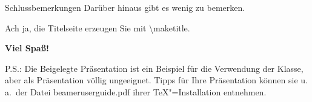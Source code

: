 \begin{frame}{Schlussbemerkungen}
  Darüber hinaus gibt es wenig zu bemerken. 

  Ach ja, die Titelseite erzeugen Sie mit \textbackslash maketitle.

  \vfill
  \begin{block}{}
    \centerline{\huge\textbf{Viel Spaß!}}
  \end{block}
  \vfill
  P.S.: Die Beigelegte Präsentation ist ein Beispiel für die Verwendung der Klasse, aber als Präsentation völlig ungeeignet. Tipps für Ihre Präsentation können sie u.\,a.\ der Datei beameruserguide.pdf ihrer \TeX"=Installation entnehmen.
\end{frame}


